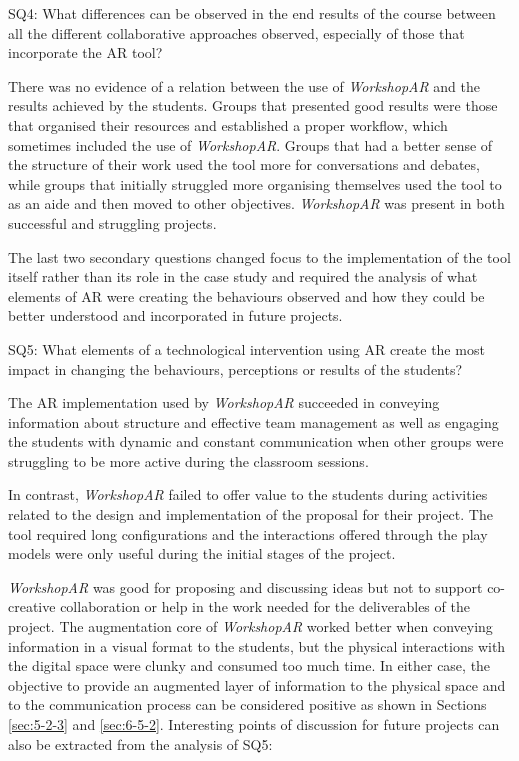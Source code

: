 \begin{displayquote}
    SQ4: What differences can be observed in the end results of the course between all the different collaborative approaches observed, especially of those that incorporate the
    \ac{AR} tool? 
\end{displayquote}

There was no evidence of a relation between the use of \emph{WorkshopAR} and the results achieved by the students. Groups that presented good results were those that organised their
resources and established a proper workflow, which sometimes included the use of \emph{WorkshopAR}. Groups that had a better sense of the structure of their work used the tool more for
conversations and debates, while groups that initially struggled more organising themselves used the tool to as an aide and then moved  to other objectives. \emph{WorkshopAR} was present
in both successful and struggling projects.

The last two secondary questions changed focus to the implementation of the tool itself rather than its role in the case study and required the analysis of what elements of \ac{AR} were
creating the behaviours observed and how they could be better understood and incorporated in future projects.

\begin{displayquote}
    SQ5: What elements of a technological intervention using \ac{AR} create the most impact in changing the behaviours, perceptions or results of the students? 
\end{displayquote}

The \ac{AR} implementation used by \emph{WorkshopAR} succeeded in conveying information about structure and effective team management as well as engaging the students with dynamic and
constant communication when other groups were struggling to be more active during the classroom sessions.

In contrast, \emph{WorkshopAR} failed to offer value to the students during activities related to the design and implementation of the proposal for their project. The tool required long
configurations and the interactions offered through the play models were only useful during the initial stages of the project.

\emph{WorkshopAR} was good for proposing and discussing ideas but not to support co-creative collaboration or help in the work needed for the deliverables of the project. The augmentation
core of \emph{WorkshopAR} worked better when conveying information in a visual format to the students, but the physical interactions with the digital space were clunky and consumed too
much time. In either case, the objective to provide an augmented layer of information to the physical space and to the communication process can be considered positive as shown in Sections
\ref{sec:5-2-3} and \ref{sec:6-5-2}. Interesting points of discussion for future projects can also be extracted from the analysis of SQ5:

